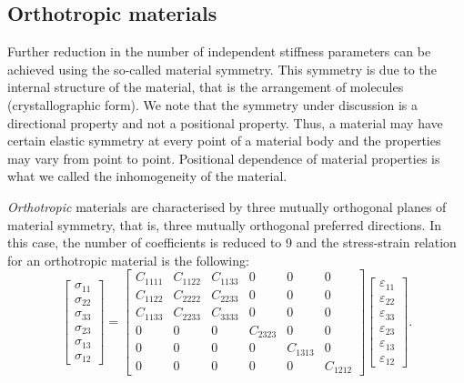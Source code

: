	\subsection{Orthotropic materials} \label{chap2:orthotropic}
Further reduction in the number of independent stiffness parameters can be achieved using the so-called material symmetry. This symmetry is due to the internal structure of the material, that is the arrangement of molecules (crystallographic form). We note that the symmetry under discussion is a directional property and not a positional property. Thus, a material may have certain elastic symmetry at every point of a material body and the properties may vary from point to point. Positional dependence of material properties is what we called the inhomogeneity of the material. 

\emph{Orthotropic} materials are characterised by three mutually orthogonal planes of material symmetry, that is, three mutually orthogonal preferred directions. In this case, the number of coefficients is reduced to 9 and the stress-strain relation for an orthotropic material is the following:
\begin{equation}
\label{chap2:orthotropic}
	\begin{bmatrix}
		\sigma_{11} \\
		\sigma_{22} \\
		\sigma_{33} \\
		\sigma_{23} \\
		\sigma_{13} \\
		\sigma_{12}
	\end{bmatrix}
= 
	\begin{bmatrix}
		C_{1111} & C_{1122} & C_{1133} &       0       &       0       &       0 \\
		C_{1122} & C_{2222} & C_{2233} &       0       &       0       &       0 \\
		C_{1133} & C_{2233} & C_{3333} &       0       &       0       &       0 \\
		      0       &        0     &        0       & C_{2323} &       0       &       0 \\
		      0       &        0     &        0       &       0       & C_{1313} &       0 \\
		      0       &        0     &        0       &       0       &       0       & C_{1212}
	\end{bmatrix}
	\begin{bmatrix}
		\varepsilon_{11} \\
		\varepsilon_{22} \\
		\varepsilon_{33} \\
		\varepsilon_{23} \\
		\varepsilon_{13} \\
		\varepsilon_{12}
	\end{bmatrix}
	.
\end{equation}

